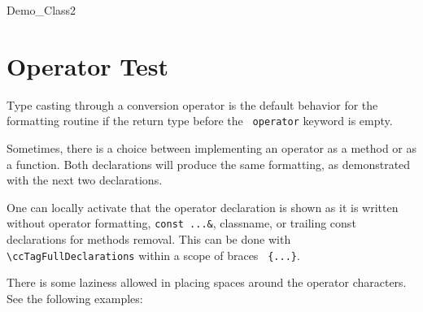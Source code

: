 \documentclass[12pt]{article}
\begin{document}
{

    \ccGlue
    \ccGlue
    \ccGlue

\begin{ccClass}{Demo_Class2}
\section{Operator Test}

Type casting through a conversion operator is the default behavior 
for the formatting routine if the return type before the {\tt 
operator} keyword is empty.

    \ccGlue

Sometimes, there is a choice between
implementing an operator as a method or as a function. Both
declarations will produce the same formatting, as demonstrated
with the next two declarations.


    \ccGlue

One can locally activate that the operator declaration is shown as it
is written without operator formatting, {\tt const ...\&}, classname, or
trailing const declarations for methods removal. This can be done with
\verb+\+\verb+ccTagFullDeclarations+ within a scope of braces {\tt
  \{...\}}.

\ccTagFullDeclarations
\ccTagDefaults

There is some laziness allowed in placing spaces around the operator
characters. See the following examples:

    \ccGlue
{}
    \ccGlue
{}
    \ccGlue
{}


\end{ccClass}}
\end{document}
